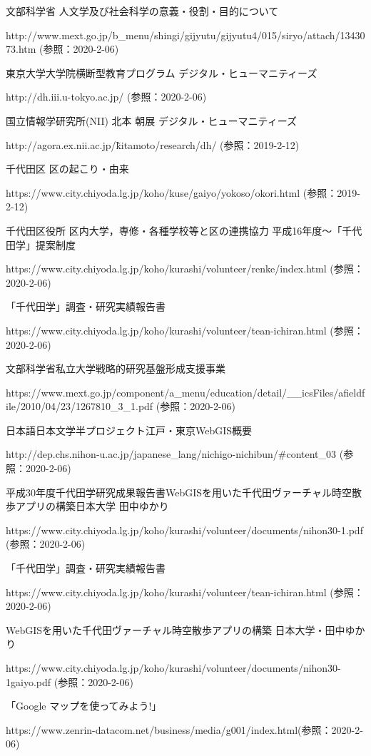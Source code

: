 \documentclass[a4paper, twoside]{jarticle}
\begin{document}
\vspace{1cm}
\begin{thebibliography}{99}

文部科学省 人文学及び社会科学の意義・役割・目的について\par
http://www.mext.go.jp/b\_menu/shingi/gijyutu/gijyutu4/015/siryo/attach/1343073.htm (参照：2020-2-06)

東京大学大学院横断型教育プログラム デジタル・ヒューマニティーズ\par
http://dh.iii.u-tokyo.ac.jp/ (参照：2020-2-06)

国立情報学研究所(NII) 北本 朝展 デジタル・ヒューマニティーズ\par
http://agora.ex.nii.ac.jp/\~kitamoto/research/dh/ (参照：2019-2-12)

千代田区 区の起こり・由来\par
https://www.city.chiyoda.lg.jp/koho/kuse/gaiyo/yokoso/okori.html (参照：2019-2-12)

千代田区役所 区内大学，専修・各種学校等と区の連携協力 平成16年度〜「千代田学」提案制度\par
https://www.city.chiyoda.lg.jp/koho/kurashi/volunteer/renke/index.html (参照：2020-2-06)

「千代田学」調査・研究実績報告書\par
https://www.city.chiyoda.lg.jp/koho/kurashi/volunteer/tean-ichiran.html (参照：2020-2-06)

文部科学省私立大学戦略的研究基盤形成支援事業\par
https://www.mext.go.jp/component/a\_menu/education/detail/\_\_icsFiles/afieldfile/2010/04/23/1267810\_3\_1.pdf (参照：2020-2-06)

日本語日本文学半プロジェクト江戸・東京WebGIS概要\par
http://dep.chs.nihon-u.ac.jp/japanese\_lang/nichigo-nichibun/\#content\_03 (参照：2020-2-06)

平成30年度千代田学研究成果報告書WebGISを用いた千代田ヴァーチャル時空散歩アプリの構築日本大学 田中ゆかり\par
https://www.city.chiyoda.lg.jp/koho/kurashi/volunteer/documents/nihon30-1.pdf (参照：2020-2-06)

「千代田学」調査・研究実績報告書\par
https://www.city.chiyoda.lg.jp/koho/kurashi/volunteer/tean-ichiran.html (参照：2020-2-06)

 WebGISを用いた千代田ヴァーチャル時空散歩アプリの構築 日本大学・田中ゆかり\par
https://www.city.chiyoda.lg.jp/koho/kurashi/volunteer/documents/nihon30-1gaiyo.pdf (参照：2020-2-06)

 「Google マップを使ってみよう!」\par
https://www.zenrin-datacom.net/business/media/g001/index.html(参照：2020-2-06)



\end{thebibliography}
\end{document}
